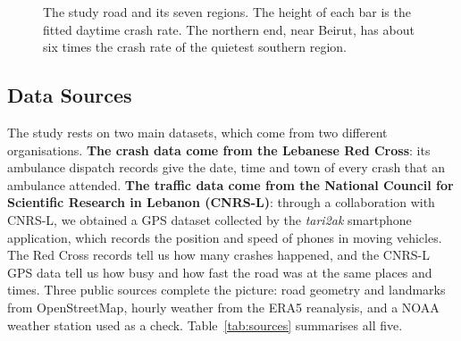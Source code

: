 \documentclass[11pt]{article}
\begin{document}
\begin{figure}[htbp]
\centering
{}
\caption{The study road and its seven regions. The height of each bar is the
fitted daytime crash rate. The northern end, near Beirut, has about six times
the crash rate of the quietest southern region.}
\label{fig:corridor}
\end{figure}

\subsection{Data Sources}

The study rests on two main datasets, which come from two different
organisations. \textbf{The crash data come from the Lebanese Red Cross}: its
ambulance dispatch records give the date, time and town of every crash that an
ambulance attended. \textbf{The traffic data come from the National Council
for Scientific Research in Lebanon (CNRS-L)}: through a collaboration with
CNRS-L, we obtained a GPS dataset collected by the \emph{tari2ak} smartphone
application, which records the position and speed of phones in moving
vehicles. The Red Cross records tell us
how many crashes happened, and the CNRS-L GPS data tell us how busy and how fast
the road was at the same places and times. Three public sources complete the
picture: road geometry and landmarks from OpenStreetMap, hourly weather from
the ERA5 reanalysis, and a NOAA weather station used as a check.
Table~\ref{tab:sources} summarises all five.
\end{document}
